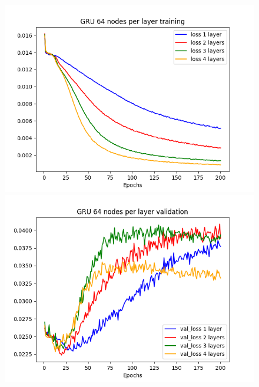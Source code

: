 \documentclass[11pt]
{article}
\begin{document}
\begin{figure}[H] 
	\hspace*{-2cm}  
	\begin{minipage}[b]{0.33\linewidth}
		\centering
		\includegraphics[width=\linewidth]{../TESTS_RESULTS/GRU_tests/plots/64_training.png} 
	\end{minipage}%
	\begin{minipage}[b]{0.33\linewidth}
		\centering
		\includegraphics[width=\linewidth]{../TESTS_RESULTS/GRU_tests/plots/64_validation.png} 
	\end{minipage} 
	\begin{minipage}[b]{0.33\linewidth}
		\centering

\end{minipage}
\end{figure}
\end{document}
